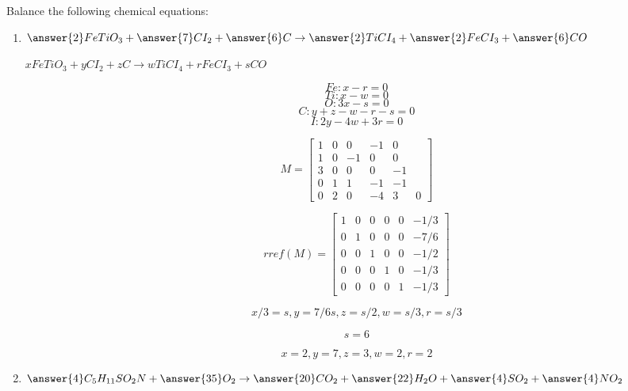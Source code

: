 \documentclass{ximera}
\author{Zack Reed}
\begin{document}
\begin{exercise}

Balance the following chemical equations:

\begin{enumerate}

    \item $\answer{2}FeTiO_3+\answer{7}CI_2+\answer{6}C\rightarrow \answer{2}TiCI_4+\answer{2}FeCI_3+\answer{6}CO$
    
    $xFeTiO_3+yCI_2+zC\rightarrow wTiCI_4+rFeCI_3+sCO$

    $$Fe: x-r=0$$
    $$Ti: x-w=0$$
    $$O: 3x-s=0$$
    $$C: y+z-w-r-s=0$$
    $$I: 2y-4w+3r=0$$

    $$M=\begin{bmatrix} 1 & 0 & 0 & -1 & 0 \\ 1 & 0 & -1 & 0 & 0 \\ 3 & 0 & 0 & 0 & -1 \\ 0 & 1 & 1 & -1 & -1 \\ 0 & 2 & 0 & -4 & 3 & 0 \end{bmatrix}$$

    $$rref(M)=\begin{bmatrix} 1 & 0 & 0 & 0 & 0 &  -1/3 \\ 
        0 & 1 & 0 & 0 & 0 &-7/6 \\ 
        0 & 0 & 1 & 0 & 0 & -1/2 \\ 
        0 & 0 & 0 & 1 & 0 & -1/3 \\ 
        0 & 0 & 0 & 0 & 1 & -1/3\end{bmatrix}$$

    $$x/3=s, y=7/6s, z=s/2, w=s/3, r=s/3$$

    $$s=6$$

    $$x=2, y=7, z=3, w=2, r=2$$
    
    \item $\answer{4}C_5H_{11}SO_2N+\answer{35}O_2\rightarrow \answer{20}CO_2+\answer{22}H_2O+\answer{4}SO_2+\answer{4}NO_2$

\end{enumerate}

\end{exercise}
\end{document}
